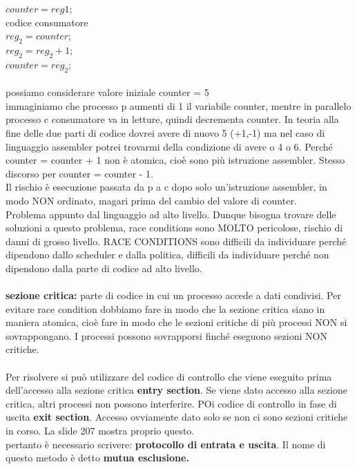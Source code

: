 \documentclass{article}
\begin{document}
$counter = reg1$;\\
codice consumatore\\
$reg_2 = counter$;\\
$reg_2 = reg_2+1$; \\
$counter = reg_2$;\\
\\
possiamo considerare valore iniziale counter = 5\\
immaginiamo che processo p aumenti di 1 il variabile counter, mentre in parallelo processo c consumatore va in letture, quindi decrementa counter.
In teoria alla fine delle due parti di codice dovrei avere di nuovo 5 (+1,-1)
ma nel caso di linguaggio assembler potrei trovarmi della condizione di avere o 4 o 6.
Perché counter = counter + 1 non è atomica, cioè sono più istruzione assembler. Stesso discorso per counter = counter - 1. \\
Il rischio è esecuzione passata da p a c dopo solo un'istruzione assembler, in modo NON ordinato, magari prima del cambio del valore di counter.\\
Problema appunto dal linguaggio ad alto livello. Dunque bisogna trovare delle soluzioni a questo problema, race conditions sono MOLTO pericolose, rischio di danni di grosso livello. RACE CONDITIONS sono difficili da individuare perché dipendono dallo scheduler e dalla politica, difficili da individuare perché non dipendono dalla parte di codice ad alto livello.
\\
\\
\textbf{sezione critica:} parte di codice in cui un processo accede a dati condivisi. Per evitare race condition dobbiamo fare in modo che la sezione critica siano in maniera atomica, cioè fare in modo che le sezioni critiche di più processi NON si sovrappongano. I processi possono sovrapporsi finché eseguono sezioni NON critiche.\\
\\
Per risolvere si può utilizzare del codice di controllo che viene eseguito prima dell'accesso alla sezione critica \textbf{entry section}. Se viene dato accesso alla sezione critica, altri processi non possono interferire. POi codice di controllo in fase di uscita \textbf{exit section}. Accesso ovviamente dato solo se non ci sono sezioni critiche in corso. La slide 207 mostra proprio questo. \\
pertanto è necessario scrivere: \textbf{protocollo di entrata e uscita}. Il nome di questo metodo è detto \textbf{mutua esclusione.} \\ \\
\end{document}
